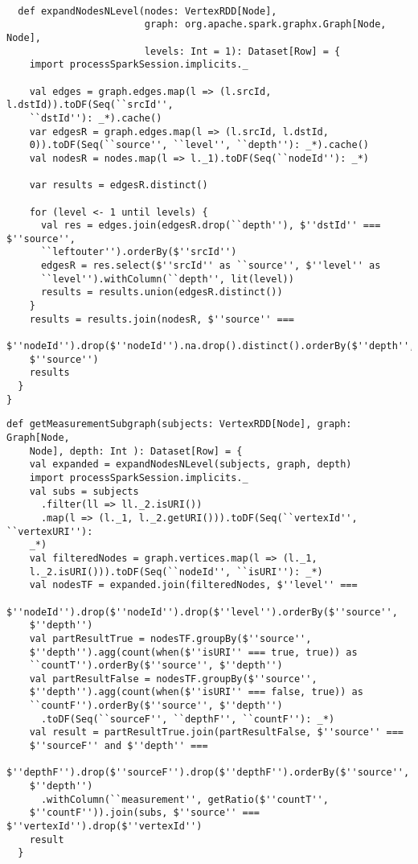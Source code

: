 \lstset{escapechar=@,language=scala}
\begin{lstlisting}[caption={Expansión de nodos en N niveles para un conjunto de
      sujetos},captionpos=b, label=graphexpandN]

  def expandNodesNLevel(nodes: VertexRDD[Node],
                        graph: org.apache.spark.graphx.Graph[Node, Node],
                        levels: Int = 1): Dataset[Row] = {
    import processSparkSession.implicits._

    val edges = graph.edges.map(l => (l.srcId, l.dstId)).toDF(Seq(``srcId'',
    ``dstId''): _*).cache()
    var edgesR = graph.edges.map(l => (l.srcId, l.dstId,
    0)).toDF(Seq(``source'', ``level'', ``depth''): _*).cache()
    val nodesR = nodes.map(l => l._1).toDF(Seq(``nodeId''): _*)

    var results = edgesR.distinct()

    for (level <- 1 until levels) {
      val res = edges.join(edgesR.drop(``depth''), $''dstId'' === $''source'',
      ``leftouter'').orderBy($''srcId'')
      edgesR = res.select($''srcId'' as ``source'', $''level'' as
      ``level'').withColumn(``depth'', lit(level))
      results = results.union(edgesR.distinct())
    }
    results = results.join(nodesR, $''source'' ===
    $''nodeId'').drop($''nodeId'').na.drop().distinct().orderBy($''depth'',
    $''source'')
    results
  }
}

\end{lstlisting}

\lstset{escapechar=@,language=scala}
\begin{lstlisting}[caption={Cálculo de la métrica en colección expandida de nodos},captionpos=b, label=graphmetric]
  def getMeasurementSubgraph(subjects: VertexRDD[Node], graph: Graph[Node,
    Node], depth: Int ): Dataset[Row] = {
    val expanded = expandNodesNLevel(subjects, graph, depth)
    import processSparkSession.implicits._
    val subs = subjects
      .filter(ll => ll._2.isURI())
      .map(l => (l._1, l._2.getURI())).toDF(Seq(``vertexId'', ``vertexURI''):
    _*)
    val filteredNodes = graph.vertices.map(l => (l._1,
    l._2.isURI())).toDF(Seq(``nodeId'', ``isURI''): _*)
    val nodesTF = expanded.join(filteredNodes, $''level'' ===
    $''nodeId'').drop($''nodeId'').drop($''level'').orderBy($''source'',
    $''depth'')
    val partResultTrue = nodesTF.groupBy($''source'',
    $''depth'').agg(count(when($''isURI'' === true, true)) as
    ``countT'').orderBy($''source'', $''depth'')
    val partResultFalse = nodesTF.groupBy($''source'',
    $''depth'').agg(count(when($''isURI'' === false, true)) as
    ``countF'').orderBy($''source'', $''depth'')
      .toDF(Seq(``sourceF'', ``depthF'', ``countF''): _*)
    val result = partResultTrue.join(partResultFalse, $''source'' ===
    $''sourceF'' and $''depth'' ===
    $''depthF'').drop($''sourceF'').drop($''depthF'').orderBy($''source'',
    $''depth'')
      .withColumn(``measurement'', getRatio($''countT'',
    $''countF'')).join(subs, $''source'' === $''vertexId'').drop($''vertexId'')
    result
  }
\end{lstlisting}

